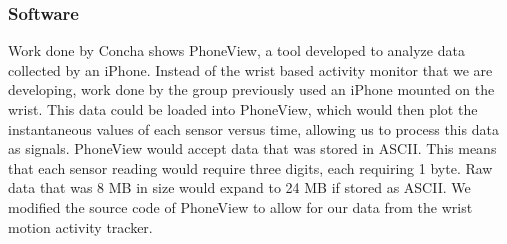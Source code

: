 \subsubsection{Software}
\label{Sec:Software}
Work done by Concha \cite{concha2014study} shows PhoneView,
a tool developed to analyze data collected by an iPhone.
Instead of the wrist based activity monitor that we are developing,
work done by the group previously used an iPhone mounted on the wrist.
This data could be loaded into PhoneView,
which would then plot the instantaneous values of each sensor versus time,
allowing us to process this data as signals.
PhoneView would accept data that was stored in ASCII.
This means that each sensor reading would require three digits,
each requiring 1 byte.
Raw data that was 8 MB in size would expand to 24 MB if stored as ASCII.
We modified the source code of PhoneView to allow for our data from the wrist motion activity tracker.

